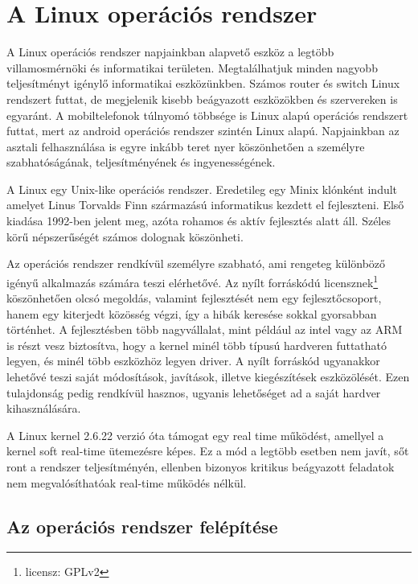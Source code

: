 \chapter{A Linux operációs rendszer}

A Linux operációs rendszer napjainkban alapvető eszköz a legtöbb villamosmérnöki és informatikai területen. Megtalálhatjuk minden nagyobb teljesítményt igénylő informatikai eszközünkben. Számos router és switch Linux rendszert
futtat, de megjelenik kisebb beágyazott eszközökben és szervereken is egyaránt. A mobiltelefonok túlnyomó többsége is Linux alapú operációs rendszert futtat, mert az android operációs rendszer szintén Linux alapú.
Napjainkban az asztali felhasználása is egyre inkább teret nyer köszönhetően a személyre szabhatóságának, teljesítményének és ingyenességének.

A Linux egy Unix-like operációs rendszer. Eredetileg egy Minix klónként indult amelyet Linus Torvalds Finn származású informatikus kezdett el fejleszteni. Első kiadása 1992-ben jelent meg, azóta rohamos és aktív fejlesztés alatt áll.
Széles körű népszerűségét számos dolognak köszönheti.

Az operációs rendszer rendkívül személyre szabható, ami rengeteg különböző igényű alkalmazás számára teszi elérhetővé. Az nyílt forráskódú licensznek\footnote{licensz: GPLv2}
köszönhetően olcsó megoldás, valamint fejlesztését nem egy fejlesztőcsoport, hanem egy kiterjedt közösség végzi, így a hibák keresése sokkal gyorsabban történhet. A fejlesztésben több nagyvállalat, mint például az intel vagy az ARM
is részt vesz biztosítva, hogy  a kernel minél több típusú hardveren futtatható legyen, és minél több eszközhöz legyen driver. A nyílt forráskód ugyanakkor lehetővé teszi saját módosítások, javítások, illetve kiegészítések
eszközölését. Ezen tulajdonság pedig rendkívül hasznos, ugyanis lehetőséget ad a saját hardver kihasználására.

A Linux kernel 2.6.22 verzió óta támogat egy real time működést, amellyel a kernel soft real-time ütemezésre képes. Ez a mód a legtöbb esetben nem javít, sőt ront a rendszer teljesítményén, ellenben bizonyos kritikus beágyazott
feladatok nem megvalósíthatóak real-time működés nélkül.

\section{Az operációs rendszer felépítése}

